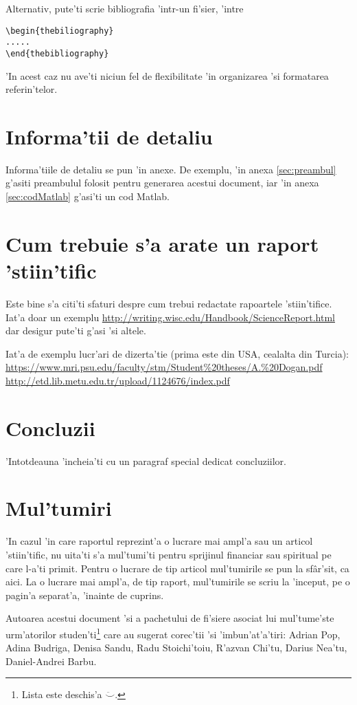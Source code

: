 Alternativ, pute'ti scrie bibliografia 'intr-un fi'sier, 'intre 
\begin{verbatim}
\begin{thebiliography}
.....
\end{thebibliography}
\end{verbatim}
'In acest caz nu ave'ti niciun fel de flexibilitate 'in organizarea
'si formatarea referin'telor. 

\section{Informa'tii de detaliu}

Informa'tiile de detaliu se pun 'in anexe. De exemplu, 'in anexa \ref{sec:preambul} g'asiti preambulul folosit pentru generarea acestui document, iar 'in anexa \ref{sec:codMatlab} g'asi'ti un cod Matlab.

\section{Cum trebuie s'a arate un raport 'stiin'tific}

Este bine s'a citi'ti sfaturi despre cum trebui redactate rapoartele 'stiin'tifice. Iat'a doar un exemplu
\href{http://writing.wisc.edu/Handbook/ScienceReport.html}{http://writing.wisc.edu/Handbook/ScienceReport.html}
dar desigur pute'ti g'asi 'si altele.

Iat'a de exemplu lucr'ari de dizerta'tie (prima este din USA, cealalta din Turcia):\\
\href{https://www.mri.psu.edu/faculty/stm/Student theses/A. Dogan.pdf}{https://www.mri.psu.edu/faculty/stm/Student\%20theses/A.\%20Dogan.pdf}\\
\href{http://etd.lib.metu.edu.tr/upload/1124676/index.pdf}{http://etd.lib.metu.edu.tr/upload/1124676/index.pdf}

\section{Concluzii} 

'Intotdeauna 'incheia'ti cu un paragraf special dedicat concluziilor.


\section*{Mul'tumiri}  %

'In cazul 'in care raportul reprezint'a o lucrare mai ampl'a sau un articol 'stiin'tific, nu uita'ti s'a mul'tumi'ti pentru sprijinul financiar sau spiritual pe care l-a'ti primit. Pentru o lucrare de tip articol mul'tumirile se pun la sf\^ar'sit, ca aici. La o lucrare mai ampl'a, de tip raport, mul'tumirile se scriu la 'inceput, pe o pagin'a separat'a, 'inainte de cuprins.

Autoarea acestui document 'si a pachetului de fi'siere asociat lui mul'tume'ste urm'atorilor studen'ti\footnote{Lista este deschis'a $\ddot\smile$.} care au sugerat corec'tii 'si 'imbun'at'a'tiri: Adrian Pop, Adina Budriga, Denisa Sandu, Radu Stoichi'toiu, R'azvan Chi'tu, Darius Nea'tu, Daniel-Andrei Barbu.




